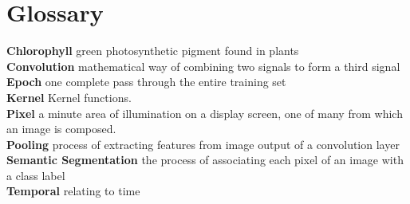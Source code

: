 \documentclass[12pt, a4paper]{report}
\begin{document}
\section*{Glossary}
\vspace*{0.5cm}
\textbf{Chlorophyll} green photosynthetic pigment found in plants\\
\textbf{Convolution} mathematical way of combining two signals to form a third signal\\
\textbf{Epoch} one complete pass through the entire training set\\
\textbf{Kernel} Kernel functions.\\
\textbf{Pixel} a minute area of illumination on a display screen, one of many from which an image is composed.\\
\textbf{Pooling} process of extracting features from image output of a convolution layer\\
\textbf{Semantic Segmentation} the process of associating each pixel of an image with a class label\\
\textbf{Temporal} relating to time\\
\end{document}
